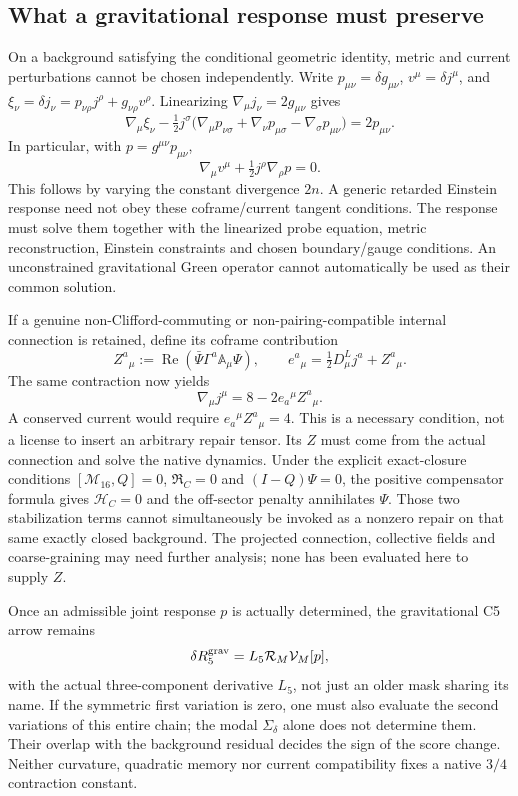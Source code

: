 \documentclass[11pt,a4paper]{article}
\begin{document}
\subsection{What a gravitational response must preserve}
On a background satisfying the conditional geometric identity, metric
and current perturbations cannot be chosen independently. Write
$p_{\mu\nu}=\delta g_{\mu\nu}$, $v^\mu=\delta j^\mu$, and
$\xi_\nu=\delta j_\nu=p_{\nu\rho}j^\rho+g_{\nu\rho}v^\rho$.
Linearizing $\nabla_\mu j_\nu=2g_{\mu\nu}$ gives
\[
 \nabla_\mu\xi_\nu
 -\tfrac12j^\sigma\bigl(
 \nabla_\mu p_{\nu\sigma}+\nabla_\nu p_{\mu\sigma}
 -\nabla_\sigma p_{\mu\nu}\bigr)=2p_{\mu\nu}.
\]
In particular, with $p=g^{\mu\nu}p_{\mu\nu}$,
\[
 \nabla_\mu v^\mu+\tfrac12 j^\rho\nabla_\rho p=0.
\]
This follows by varying the constant divergence $2n$. A generic
retarded Einstein response need not obey these coframe/current tangent
conditions. The response must solve them together with the linearized
probe equation, metric reconstruction, Einstein constraints and chosen
boundary/gauge conditions. An unconstrained gravitational Green
operator cannot automatically be used as their common solution.

If a genuine non-Clifford-commuting or non-pairing-compatible internal
connection is retained, define its coframe contribution
\[
 Z^a{}_{\mu}:=\operatorname{Re}
 (\bar\Psi\Gamma^a\mathbb A_\mu\Psi),\qquad
 e^a{}_{\mu}=\tfrac12D^L_\mu j^a+Z^a{}_{\mu}.
\]
The same contraction now yields
\[
 \nabla_\mu j^\mu=8-2e_a{}^\mu Z^a{}_{\mu}.
\]
A conserved current would require $e_a{}^\mu Z^a{}_{\mu}=4$.
This is a necessary condition, not a license to insert an arbitrary
repair tensor. Its $Z$ must come from the actual connection and solve
the native dynamics. Under the explicit exact-closure conditions
$[\mathcal M_{16},Q]=0$, $\mathfrak R_C=0$ and $(I-Q)\Psi=0$,
the positive compensator formula gives $\mathcal H_C=0$ and the
off-sector penalty annihilates $\Psi$. Those two stabilization terms
cannot simultaneously be invoked as a nonzero repair on that same
exactly closed background. The projected connection, collective
fields and coarse-graining may need further analysis; none has been
evaluated here to supply $Z$.

Once an admissible joint response $p$ is actually determined, the
gravitational C5 arrow remains
\[
 \delta R_5^{\rm grav}=L_5\mathcal R_M\mathcal V_M[p],
\]
with the actual three-component derivative $L_5$, not just an older
mask sharing its name. If the symmetric first variation is zero,
one must also evaluate the second variations of this entire chain;
the modal $\Sigma_\delta$ alone does not determine them. Their overlap
with the background residual decides the sign of the score change.
Neither curvature, quadratic memory nor current compatibility fixes a
native $3/4$ contraction constant.
\end{document}
